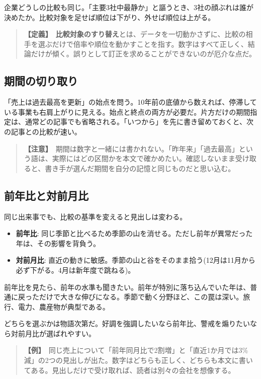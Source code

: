 \documentclass{article}
\begin{document}
企業どうしの比較も同じ。「主要3社中最静か」と謳うとき、3社の顔ぶれは誰が決めたか。比較対象を足せば順位は下がり、外せば順位は上がる。

\begin{quote}
\textbf{【定義】}\ \textbf{比較対象のすり替え}とは、データを一切動かさずに、比較の相手を選ぶだけで倍率や順位を動かすことを指す。数字はすべて正しく、結論だけが傾く。誤りとして訂正を求めることができないのが厄介な点だ。
\end{quote}

\subsection{期間の切り取り}

「売上は過去最高を更新」の始点を問う。10年前の底値から数えれば、停滞している事業も右肩上がりに見える。始点と終点の両方が必要だ。片方だけの期間指定は、通常どの記事でも省略される。「いつから」を先に書き留めておくと、次の記事との比較が速い。

\begin{quote}
\textbf{【注意】}\ 期間は数字と一緒には書かれない。「昨年来」「過去最高」という語は、実際にはどの区間かを本文で確かめたい。確認しないまま受け取ると、書き手が選んだ期間を自分の記憶と同じものだと思い込む。
\end{quote}

\subsection{前年比と対前月比}

同じ出来事でも、比較の基準を変えると見出しは変わる。

\begin{itemize}
\item \textbf{前年比}: 同じ季節と比べるため季節の山を消せる。ただし前年が異常だった年は、その影響を背負う。
\item \textbf{対前月比}: 直近の動きに敏感。季節の山と谷をそのまま拾う(12月は11月から必ず下がる。4月は新年度で跳ねる)。
\end{itemize}

前年比を見たら、前年の水準も聞きたい。前年が特別に落ち込んでいた年は、普通に戻っただけで大きな伸びになる。季節で動く分野ほど、この罠は深い。旅行、電力、農産物が典型である。

どちらを選ぶかは物語次第だ。好調を強調したいなら前年比、警戒を煽りたいなら対前月比が選ばれやすい。

\begin{quote}
\textbf{【例】}\ 同じ売上について「前年同月比で2割増」と「直近1か月では3\%減」の2つの見出しが出た。数字はどちらも正しく、どちらも本文に書いてある。見出しだけで受け取れば、読者は別々の会社を想像する。
\end{quote}
\end{document}
